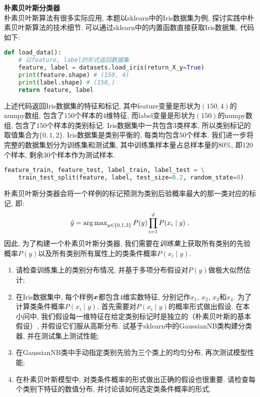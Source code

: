 \documentclass[answers]{exam}  %
\begin{document}
\begin{questions}
\question [20] \textbf{朴素贝叶斯分类器} \\
朴素贝叶斯算法有很多实际应用, 本题以sklearn中的Iris数据集为例, 探讨实践中朴素贝叶斯算法的技术细节. 可以通过sklearn中的内置函数直接获取Iris数据集, 代码如下:
\begin{lstlisting}[language=Python]
def load_data():
    # 以feature, label的形式返回数据集
    feature, label = datasets.load_iris(return_X_y=True)
    print(feature.shape) # (150, 4)
    print(label.shape) # (150,)
    return feature, label
\end{lstlisting}
上述代码返回Iris数据集的特征和标记, 其中feature变量是形状为$(150, 4)$的numpy数组, 包含了$150$个样本的$4$维特征, 而label变量是形状为$(150)$的numpy数组, 包含了$150$个样本的类别标记. Iris数据集中一共包含$3$类样本, 所以类别标记的取值集合为$\{0,1,2\}$. Iris数据集是类别平衡的, 每类均包含$50$个样本. 我们进一步将完整的数据集划分为训练集和测试集, 其中训练集样本量占总样本量的$80\%$, 即$120$个样本, 剩余$30$个样本作为测试样本.
\begin{lstlisting}[language=Python]
feature_train, feature_test, label_train, label_test = \
    train_test_split(feature, label, test_size=0.2, random_state=0)
\end{lstlisting}
朴素贝叶斯分类器会将一个样例的标记预测为类别后验概率最大的那一类对应的标记, 即:
\begin{equation}
\hat{y}=\operatorname{arg\,max}_{y\in\{0,1,2\}}P(y)\prod_{i=1}^{d}P(x_i\mid y)\;.
\end{equation}
因此, 为了构建一个朴素贝叶斯分类器, 我们需要在{\em 训练集}上获取所有类别的先验概率$P(y)$以及所有类别所有属性上的类条件概率$P(x_i\mid y)$.

\begin{enumerate}
    \item 请检查训练集上的类别分布情况, 并基于多项分布假设对$P(y)$做极大似然估计;
    \item 在Iris数据集中, 每个样例${\boldsymbol{x}}$都包含$4$维实数特征, 分别记作$x_1$, $x_2$, $x_3$和$x_4$. 为了计算类条件概率$P(x_i\mid y)$, 首先需要对$P(x_i\mid y)$的概率形式做出假设. 在本小问中, 我们假设每一维特征在给定类别标记时是独立的（朴素贝叶斯的基本假设）, 并假设它们服从高斯分布. 试基于sklearn中的GaussianNB类构建分类器, 并在测试集上测试性能;
    \item 在GaussianNB类中手动指定类别先验为三个类上的均匀分布, 再次测试模型性能;
    \item 在朴素贝叶斯模型中, 对类条件概率的形式做出正确的假设也很重要. 请检查每个类别下特征的数值分布, 并讨论该如何选定类条件概率的形式.
\end{enumerate}


\end{questions}
\end{document}
